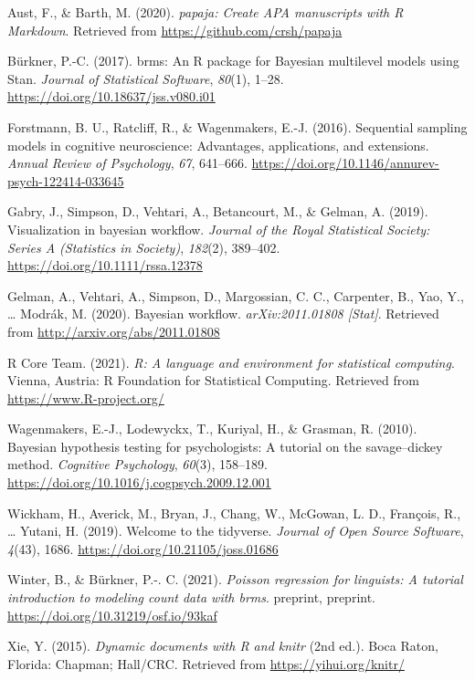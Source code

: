\documentclass[
  11pt,
  english,
  ,doc,mask,floatsintext]{apa6}
\newlength{\cslhangindent}
\newlength{\cslentryspacingunit} %
\newenvironment{CSLReferences}[2] %
 {%
  \setlength{\parindent}{0pt}
  \ifodd #1
  \let\oldpar\par
  \def\par{\hangindent=\cslhangindent\oldpar}
  \fi
  \setlength{\parskip}{#2\cslentryspacingunit}
 }%
 {}
\begin{document}
\hypertarget{refs}{}
\begin{CSLReferences}{1}{0}
\leavevmode{}%
Aust, F., \& Barth, M. (2020). \emph{{papaja}: {Create} {APA} manuscripts with {R Markdown}}. Retrieved from \url{https://github.com/crsh/papaja}

\leavevmode{}%
Bürkner, P.-C. (2017). {brms}: An {R} package for {Bayesian} multilevel models using {Stan}. \emph{Journal of Statistical Software}, \emph{80}(1), 1--28. \url{https://doi.org/10.18637/jss.v080.i01}

\leavevmode{}%
Forstmann, B. U., Ratcliff, R., \& Wagenmakers, E.-J. (2016). Sequential sampling models in cognitive neuroscience: Advantages, applications, and extensions. \emph{Annual Review of Psychology}, \emph{67}, 641--666. \url{https://doi.org/10.1146/annurev-psych-122414-033645}

\leavevmode{}%
Gabry, J., Simpson, D., Vehtari, A., Betancourt, M., \& Gelman, A. (2019). Visualization in bayesian workﬂow. \emph{Journal of the Royal Statistical Society: Series A (Statistics in Society)}, \emph{182}(2), 389--402. \url{https://doi.org/10.1111/rssa.12378}

\leavevmode{}%
Gelman, A., Vehtari, A., Simpson, D., Margossian, C. C., Carpenter, B., Yao, Y., \ldots{} Modrák, M. (2020). Bayesian workflow. \emph{{arXiv}:2011.01808 {[}Stat{]}}. Retrieved from \url{http://arxiv.org/abs/2011.01808}

\leavevmode{}%
R Core Team. (2021). \emph{R: A language and environment for statistical computing}. Vienna, Austria: R Foundation for Statistical Computing. Retrieved from \url{https://www.R-project.org/}

\leavevmode{}%
Wagenmakers, E.-J., Lodewyckx, T., Kuriyal, H., \& Grasman, R. (2010). Bayesian hypothesis testing for psychologists: A tutorial on the savage--dickey method. \emph{Cognitive Psychology}, \emph{60}(3), 158--189. \url{https://doi.org/10.1016/j.cogpsych.2009.12.001}

\leavevmode{}%
Wickham, H., Averick, M., Bryan, J., Chang, W., McGowan, L. D., François, R., \ldots{} Yutani, H. (2019). Welcome to the {tidyverse}. \emph{Journal of Open Source Software}, \emph{4}(43), 1686. \url{https://doi.org/10.21105/joss.01686}

\leavevmode{}%
Winter, B., \& Bürkner, P.-. C. (2021). \emph{Poisson regression for linguists: A tutorial introduction to modeling count data with brms}. preprint, preprint. \url{https://doi.org/10.31219/osf.io/93kaf}

\leavevmode{}%
Xie, Y. (2015). \emph{Dynamic documents with {R} and knitr} (2nd ed.). Boca Raton, Florida: Chapman; Hall/CRC. Retrieved from \url{https://yihui.org/knitr/}

\end{CSLReferences}
\end{document}
